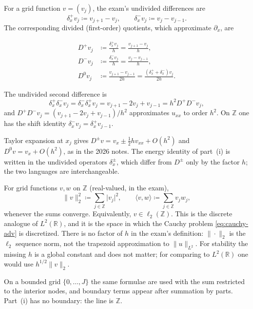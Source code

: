 \begin{definition}
\label{def:delta}
For a grid function \(v=(v_j)\), the exam's undivided differences are
\[
\delta_x^+ v_j
\coloneqq
v_{j+1}-v_j,
\qquad
\delta_x^- v_j
\coloneqq
v_j-v_{j-1}.
\]
The corresponding divided (first-order) quotients, which approximate \(\partial_x\), are

\begin{align*}
D^+ v_j
&\coloneqq
\frac{\delta_x^+ v_j}{h}
=
\frac{v_{j+1}-v_j}{h},
\\
D^- v_j
&\coloneqq
\frac{\delta_x^- v_j}{h}
=
\frac{v_j-v_{j-1}}{h},
\\
D^0 v_j
&\coloneqq
\frac{v_{j+1}-v_{j-1}}{2h}
=
\frac{(\delta_x^++\delta_x^-)v_j}{2h}.
\end{align*}

The undivided second difference is
\[
\delta_x^+\delta_x^- v_j
=
\delta_x^-\delta_x^+ v_j
=
v_{j+1}-2v_j+v_{j-1}
=
h^2 D^+D^- v_j,
\]
and \(D^+D^-v_j=(v_{j+1}-2v_j+v_{j-1})/h^2\) approximates \(u_{xx}\) to order \(h^2\). On \(\mathbb{Z}\) one has the shift identity \(\delta_x^- v_j=\delta_x^+ v_{j-1}\).
\end{definition}

Taylor expansion at \(x_j\) gives \(D^\pm v=v_x\pm\tfrac12 h v_{xx}+O(h^2)\) and \(D^0 v=v_x+O(h^2)\), as in the 2026 notes. The energy identity of part~(i) is written in the undivided operators \(\delta_x^\pm\), which differ from \(D^\pm\) only by the factor \(h\); the two languages are interchangeable.

\begin{definition}
\label{def:discrete-l2}
For grid functions \(v,w\) on \(\mathbb{Z}\) (real-valued, in the exam),
\[
\|v\|_2^2
\coloneqq
\sum_{j\in\mathbb{Z}}\lvert v_j\rvert^2,
\qquad
\langle v,w\rangle
\coloneqq
\sum_{j\in\mathbb{Z}} v_j w_j,
\]
whenever the sums converge. Equivalently, \(v\in\ell_2(\mathbb{Z})\). This is the discrete analogue of \(L^2(\mathbb{R})\), and it is the space in which the Cauchy problem \eqref{eq:cauchy-adv} is discretized. There is no factor of \(h\) in the exam's definition: \(\|\cdot\|_2\) is the \(\ell_2\) sequence norm, not the trapezoid approximation to \(\|u\|_{L^2}\). For stability the missing \(h\) is a global constant and does not matter; for comparing to \(L^2(\mathbb{R})\) one would use \(h^{1/2}\|v\|_2\).
\end{definition}

On a bounded grid \(\{0,\dots,J\}\) the same formulae are used with the sum restricted to the interior nodes, and boundary terms appear after summation by parts. Part~(i) has no boundary: the line is \(\mathbb{Z}\).

